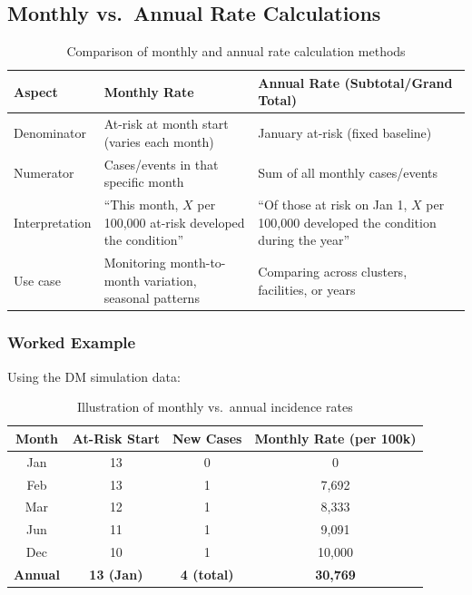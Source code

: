 \documentclass[11pt,a4paper]{article}
\begin{document}
\subsection{Monthly vs.\ Annual Rate Calculations}

\begin{table}[ht]
\centering
\caption{Comparison of monthly and annual rate calculation methods}
\begin{tabular}{@{}p{} p{} p{}@{}}
\toprule
\textbf{Aspect} & \textbf{Monthly Rate} & \textbf{Annual Rate (Subtotal/Grand Total)} \\
\midrule
Denominator & At-risk at month start (varies each month) & January at-risk (fixed baseline) \\
Numerator & Cases/events in that specific month & Sum of all monthly cases/events \\
Interpretation & ``This month, $X$ per 100,000 at-risk developed the condition'' & ``Of those at risk on Jan 1, $X$ per 100,000 developed the condition during the year'' \\
Use case & Monitoring month-to-month variation, seasonal patterns & Comparing across clusters, facilities, or years \\
\bottomrule
\end{tabular}
\end{table}

\subsubsection{Worked Example}

Using the DM simulation data:

\begin{table}[ht]
\centering
\caption{Illustration of monthly vs.\ annual incidence rates}
\begin{tabular}{@{}cccc@{}}
\toprule
\textbf{Month} & \textbf{At-Risk Start} & \textbf{New Cases} & \textbf{Monthly Rate (per 100k)} \\
\midrule
Jan  & 13 & 0 & 0 \\
Feb  & 13 & 1 & 7,692 \\
Mar  & 12 & 1 & 8,333 \\
Jun  & 11 & 1 & 9,091 \\
Dec  & 10 & 1 & 10,000 \\
\midrule
\textbf{Annual} & \textbf{13 (Jan)} & \textbf{4 (total)} & \textbf{30,769} \\
\bottomrule
\end{tabular}
\end{table}
\end{document}

